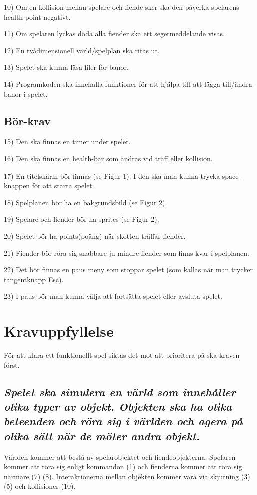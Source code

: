 \documentclass{TDP005mall}
\begin{document}
10) Om en kollision mellan spelare och fiende sker ska den påverka spelarens health-point negativt.

11) Om spelaren lyckas döda alla fiender ska ett segermeddelande visas.

12) En tvådimensionell värld/spelplan ska ritas ut. 

13) Spelet ska kunna läsa filer för banor.

14) Programkoden ska innehålla funktioner för att hjälpa till att lägga till/ändra banor i spelet.

\subsection{Bör-krav}
15) Den ska finnas en timer under spelet.

16) Den ska finnas en health-bar som ändras vid träff eller kollision. 

17) En titelskärm bör finnas (se Figur 1). I den ska man kunna trycka space-knappen för att starta spelet.

18) Spelplanen bör ha en bakgrundsbild (se Figur 2).

19) Spelare och fiender bör ha sprites (se Figur 2).

20) Spelet bör ha points(poäng) när skotten träffar fiender.

21) Fiender bör röra sig snabbare ju mindre fiender som finns kvar i spelplanen.

22) Det bör finnas en paus meny som stoppar spelet (som kallas när man trycker tangentknapp Esc).

23) I paus bör man kunna välja att fortsätta spelet eller avsluta spelet.

\section{Kravuppfyllelse}
För att klara ett funktionellt spel siktas det mot att prioritera på ska-kraven först.

\subsection{\textit{Spelet ska simulera en värld som innehåller olika typer av objekt. Objekten ska ha olika beteenden och röra sig i världen och agera på olika sätt när de möter andra objekt.}}

Världen kommer att bestå av spelarobjektet och fiendeobjekterna. Spelaren kommer att röra sig enligt kommandon (1) och fienderna kommer att röra sig närmare (7) (8). Interaktionerna mellan objekten kommer vara via skjutning (3) (5) och kollisioner (10).
\end{document}
